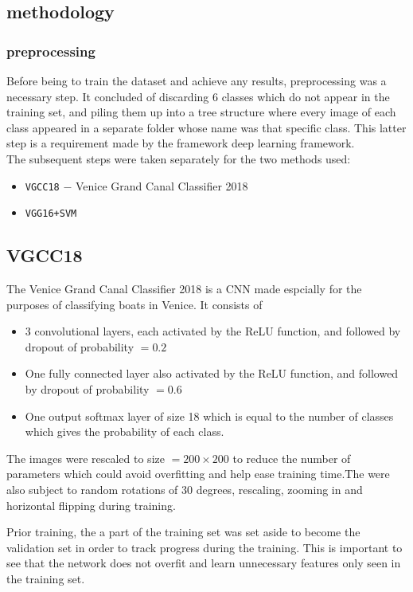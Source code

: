 \documentclass[12pt,a4paper]{article}
\begin{document}
\subsection{methodology}
\subsubsection{preprocessing}
Before being to train the dataset and achieve any results, preprocessing was a necessary step. It concluded of discarding 6 classes which do not appear in the training set, and piling them up into a tree structure where every image of each class appeared in a separate folder whose name was that specific class. This latter step is a requirement made by the framework deep learning framework.\\
The subsequent steps were taken separately for the two methods used:
\begin{itemize}
\item \texttt{VGCC18} $-$ Venice Grand Canal Classifier 2018 
\item \texttt{VGG16+SVM} 
\end{itemize}
\subsection{VGCC18}
The Venice Grand Canal Classifier 2018 is a CNN made espcially for the purposes of classifying boats in Venice. It consists of 
\begin{itemize}
\item 3  convolutional layers, each activated by the ReLU function, and followed by dropout of probability $=0.2$ 
\item One fully connected layer also activated by the ReLU function, and followed by dropout of probability $=0.6$ 
\item One output softmax layer of size 18 which is equal to the number of classes which gives the probability of each class.
\end{itemize}
The images were rescaled to size $=200 \times 200$ to reduce the number of parameters which could avoid overfitting and help ease training time.The were also subject to random rotations of 30 degrees, rescaling, zooming in and horizontal flipping during training.

Prior training, the a part of the training set was set aside to become the validation set in order to track progress during the training. This is important to see that the network does not overfit and learn unnecessary features only seen in the training set.
\end{document}
